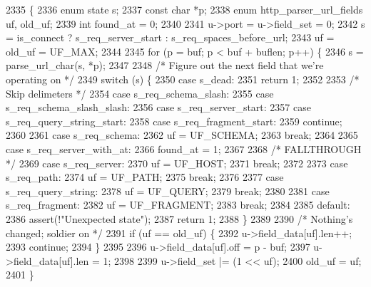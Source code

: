 \begin{DoxyCode}
2335 \{
2336   \textcolor{keyword}{enum} state s;
2337   \textcolor{keyword}{const} \textcolor{keywordtype}{char} *p;
2338   \textcolor{keyword}{enum} http_parser_url_fields uf, old\_uf;
2339   \textcolor{keywordtype}{int} found\_at = 0;
2340 
2341   u->port = u->field_set = 0;
2342   s = is\_connect ? s_req_server_start : s_req_spaces_before_url;
2343   uf = old\_uf = UF_MAX;
2344 
2345   \textcolor{keywordflow}{for} (p = buf; p < buf + buflen; p++) \{
2346     s = parse_url_char(s, *p);
2347 
2348     \textcolor{comment}{/* Figure out the next field that we're operating on */}
2349     \textcolor{keywordflow}{switch} (s) \{
2350       \textcolor{keywordflow}{case} s_dead:
2351         \textcolor{keywordflow}{return} 1;
2352 
2353       \textcolor{comment}{/* Skip delimeters */}
2354       \textcolor{keywordflow}{case} s_req_schema_slash:
2355       \textcolor{keywordflow}{case} s_req_schema_slash_slash:
2356       \textcolor{keywordflow}{case} s_req_server_start:
2357       \textcolor{keywordflow}{case} s_req_query_string_start:
2358       \textcolor{keywordflow}{case} s_req_fragment_start:
2359         \textcolor{keywordflow}{continue};
2360 
2361       \textcolor{keywordflow}{case} s_req_schema:
2362         uf = UF_SCHEMA;
2363         \textcolor{keywordflow}{break};
2364 
2365       \textcolor{keywordflow}{case} s_req_server_with_at:
2366         found\_at = 1;
2367 
2368       \textcolor{comment}{/* FALLTHROUGH */}
2369       \textcolor{keywordflow}{case} s_req_server:
2370         uf = UF_HOST;
2371         \textcolor{keywordflow}{break};
2372 
2373       \textcolor{keywordflow}{case} s_req_path:
2374         uf = UF_PATH;
2375         \textcolor{keywordflow}{break};
2376 
2377       \textcolor{keywordflow}{case} s_req_query_string:
2378         uf = UF_QUERY;
2379         \textcolor{keywordflow}{break};
2380 
2381       \textcolor{keywordflow}{case} s_req_fragment:
2382         uf = UF_FRAGMENT;
2383         \textcolor{keywordflow}{break};
2384 
2385       \textcolor{keywordflow}{default}:
2386         assert(!\textcolor{stringliteral}{"Unexpected state"});
2387         \textcolor{keywordflow}{return} 1;
2388     \}
2389 
2390     \textcolor{comment}{/* Nothing's changed; soldier on */}
2391     \textcolor{keywordflow}{if} (uf == old\_uf) \{
2392       u->field_data[uf].len++;
2393       \textcolor{keywordflow}{continue};
2394     \}
2395 
2396     u->field_data[uf].off = p - buf;
2397     u->field_data[uf].len = 1;
2398 
2399     u->field_set |= (1 << uf);
2400     old\_uf = uf;
2401   \}

\end{DoxyCode}
